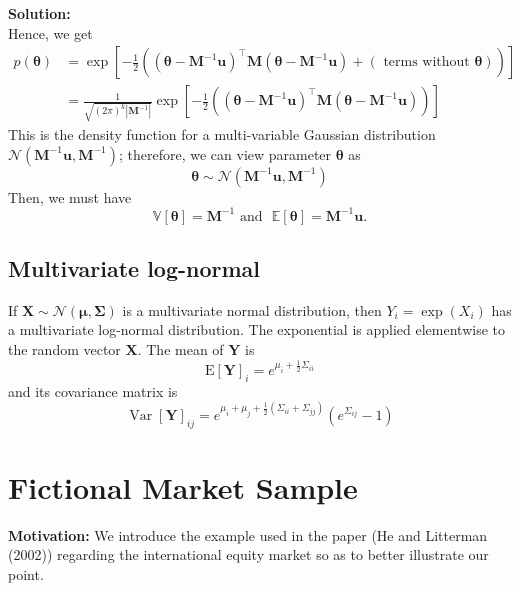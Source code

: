 \documentclass[13pt]{article}
\theoremstyle{definition}
\newenvironment{solution}
{\color{C2}\begin{framed}\begingroup\textbf{Solution:} }
  {\endgroup\end{framed}}
\theoremstyle{remark}
\begin{document}
\begin{solution}
\[    \]
    Hence, we get
    \begin{align*}
    p(\boldsymbol{\theta}) &= \exp\left[-\frac{1}{2}\left((\boldsymbol{\theta}-\mathbf{M}^{-1}\boldsymbol{u})^{\top} \mathbf{M}(\boldsymbol{\theta}-\mathbf{M}^{-1}\boldsymbol{u})+(\text{ terms without }\boldsymbol{\theta})\right)\right]\\
    &= \frac{1}{\sqrt{(2 \pi)^k|\mathbf{M}^{-1}|}} \exp\left[-\frac{1}{2}\left((\boldsymbol{\theta}-\mathbf{M}^{-1}\boldsymbol{u})^{\top} \mathbf{M}(\boldsymbol{\theta}-\mathbf{M}^{-1}\boldsymbol{u})\right)\right]
    \end{align*}
    This is the density function for a multi-variable Gaussian distribution $\mathcal{N}\left(\mathbf{M}^{-1}\boldsymbol{u}, \mathbf{M}^{-1}\right)$; therefore, we can view parameter $\bm{\theta}$ as 
    \[
    \bm{\theta} \sim \mathcal{N}\left(\mathbf{M}^{-1}\boldsymbol{u}, \mathbf{M}^{-1}\right)
    \]
    Then, we must have
    \[
    \mathbb{V}[\boldsymbol{\theta}]=\mathbf{M}^{-1} \text{ and ~} \mathbb{E} [\boldsymbol{\theta}]=\mathbf{M}^{-1} \boldsymbol{u}.
    \]
\end{solution}

\subsection{Multivariate log-normal}\label{subsec:log-normal}
If $\boldsymbol{X} \sim \mathcal{N}(\boldsymbol{\mu}, \boldsymbol{\Sigma})$ is a multivariate normal distribution, then $Y_i=\exp \left(X_i\right)$ has a multivariate log-normal distribution.  The exponential is applied elementwise to the random vector $\boldsymbol{X}$. The mean of $\boldsymbol{Y}$ is
$$
\mathrm{E}[\boldsymbol{Y}]_i=e^{\mu_i+\frac{1}{2} \Sigma_{i i}}
$$
and its covariance matrix is
$$
\operatorname{Var}[\boldsymbol{Y}]_{i j}=e^{\mu_i+\mu_j+\frac{1}{2}\left(\Sigma_{i i}+\Sigma_{j j}\right)}\left(e^{\Sigma_{i j}}-1\right)
$$


\newpage
\section{Fictional Market Sample}\label{sec:Fictional Market Sample}
{\color{C6} \textbf{Motivation:} We introduce the example used in the paper (He and Litterman (2002)) regarding the international equity market so as to better  illustrate our point.}
\end{document}
